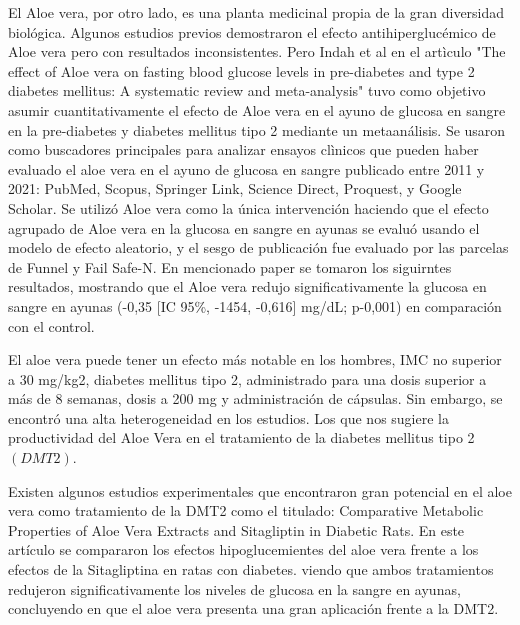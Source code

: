 El Aloe vera, por otro lado, es una planta medicinal propia de la gran diversidad biológica. Algunos estudios previos demostraron el efecto antihiperglucémico de Aloe vera pero con resultados inconsistentes. 
Pero Indah et al en el artìculo "The effect of Aloe vera on fasting blood glucose levels in pre-diabetes and type 2 diabetes mellitus: A systematic review and meta-analysis" tuvo como objetivo asumir cuantitativamente el efecto de Aloe vera en el ayuno de glucosa en sangre en la pre-diabetes y diabetes mellitus tipo 2 mediante un metaanálisis.
Se usaron como buscadores principales para analizar ensayos clìnicos que pueden haber evaluado el aloe vera en el ayuno de glucosa en sangre publicado entre 2011 y 2021: PubMed, Scopus, Springer Link, Science Direct, Proquest, y Google Scholar. Se utilizó Aloe vera como la única intervención haciendo que el efecto agrupado de Aloe vera en la glucosa en sangre en ayunas se evaluó usando el modelo de efecto aleatorio, y el sesgo de publicación fue evaluado por las parcelas de Funnel y Fail Safe-N. En mencionado paper se tomaron los siguirntes resultados, mostrando que el Aloe vera redujo significativamente la glucosa en sangre en ayunas (-0,35 [IC 95\%, -1454, -0,616] mg/dL; p-0,001) en comparación con el control. 

El aloe vera puede tener un efecto más notable en los hombres, IMC no superior a 30 mg/kg2, diabetes mellitus tipo 2, administrado para una dosis superior a más de 8 semanas, dosis a 200 mg y administración de cápsulas. Sin embargo, se encontró una alta heterogeneidad en los estudios. Los que nos sugiere la productividad del Aloe Vera en el tratamiento de la diabetes mellitus tipo 2 $(DMT2)$.\cite{Budiastutik2022}

Existen algunos estudios experimentales que encontraron gran potencial en el aloe vera como tratamiento de la DMT2 como el titulado: Comparative Metabolic Properties of Aloe Vera Extracts and Sitagliptin in Diabetic Rats. En este artículo se compararon los efectos hipoglucemientes del aloe vera frente a los efectos de la Sitagliptina en ratas con diabetes. viendo que ambos tratamientos redujeron significativamente los niveles de glucosa en la sangre en ayunas, concluyendo en que el aloe vera presenta una gran aplicación frente a la DMT2. \cite{Budiastutik2022,JavaidandZafar}





